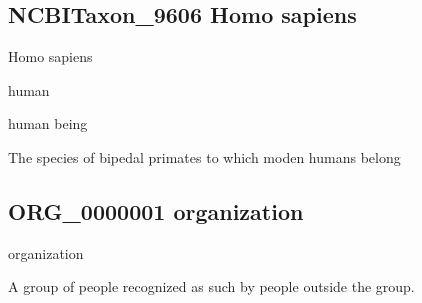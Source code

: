 \documentclass[letterpaper,10pt,english]{sphinxmanual}
\begin{document}
\subsection{NCBITaxon\_9606 \sphinxhyphen{} Homo sapiens}
\label{\detokenize{doc-NCBITaxon_9606:ncbitaxon-9606-homo-sapiens}}\label{\detokenize{doc-NCBITaxon_9606:index-0}}\label{\detokenize{doc-NCBITaxon_9606::doc}}
\begin{sphinxShadowBox}

\sphinxAtStartPar
Homo sapiens
\end{sphinxShadowBox}

\begin{sphinxShadowBox}

\sphinxAtStartPar
human

\sphinxAtStartPar
human being
\end{sphinxShadowBox}

\begin{sphinxShadowBox}

\sphinxAtStartPar
The species of bipedal primates to which moden humans belong
\end{sphinxShadowBox}

\begin{sphinxShadowBox}

\sphinxAtStartPar
{}
\end{sphinxShadowBox}
\begin{quote}

\ignorespaces \end{quote}


\subsection{ORG\_0000001 \sphinxhyphen{} organization}
\label{\detokenize{doc-ORG_0000001:org-0000001-organization}}\label{\detokenize{doc-ORG_0000001:index-0}}\label{\detokenize{doc-ORG_0000001::doc}}
\begin{sphinxShadowBox}

\sphinxAtStartPar
organization
\end{sphinxShadowBox}

\begin{sphinxShadowBox}

\sphinxAtStartPar
A group of people recognized as such by people outside the group.
\end{sphinxShadowBox}
\end{document}
